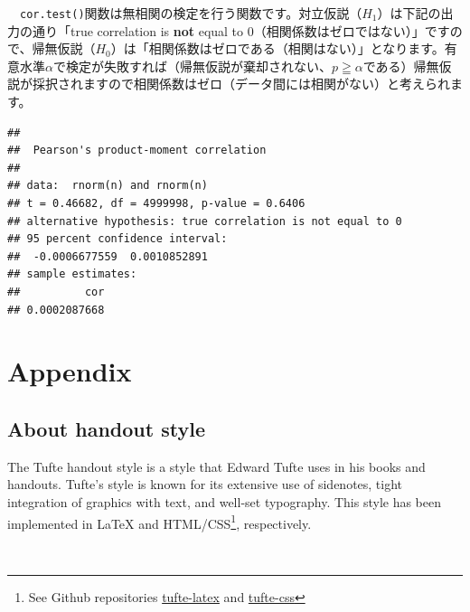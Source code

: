 \documentclass[]{tufte-handout}
\begin{document}
　\texttt{cor.test()}関数は無相関の検定を行う関数です。対立仮説（\(H_1\)）は下記の出力の通り「true
correlation is \textbf{not} equal to
0（相関係数はゼロではない）」ですので、帰無仮説（\(H_0\)）は「相関係数はゼロである（相関はない）」となります。有意水準\(\alpha\)で検定が失敗すれば（帰無仮説が棄却されない、\(p \geqq \alpha\)である）帰無仮説が採択されますので相関係数はゼロ（データ間には相関がない）と考えられます。

\begin{verbatim}
## 
##  Pearson's product-moment correlation
## 
## data:  rnorm(n) and rnorm(n)
## t = 0.46682, df = 4999998, p-value = 0.6406
## alternative hypothesis: true correlation is not equal to 0
## 95 percent confidence interval:
##  -0.0006677559  0.0010852891
## sample estimates:
##          cor 
## 0.0002087668
\end{verbatim}

\newpage

\hypertarget{appendix}{%
\section{Appendix}\label{appendix}}

\hypertarget{about-handout-style}{%
\subsection{About handout style}\label{about-handout-style}}

The Tufte handout style is a style that Edward Tufte uses in his books
and handouts. Tufte's style is known for its extensive use of sidenotes,
tight integration of graphics with text, and well-set typography. This
style has been implemented in LaTeX and HTML/CSS\footnote{See Github
  repositories
  \href{https://github.com/tufte-latex/tufte-latex}{tufte-latex} and
  \href{https://github.com/edwardtufte/tufte-css}{tufte-css}},
respectively.

　


\end{document}
